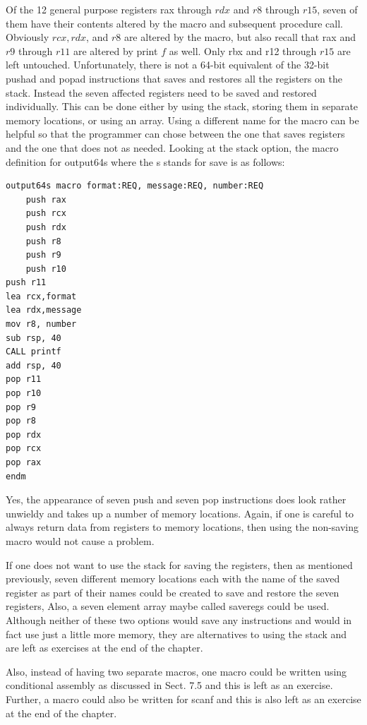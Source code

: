 \documentclass[10pt]{article}
\begin{document}
Of the 12 general purpose registers rax through $r d x$ and $r 8$ through $r 15$, seven of them have their contents altered by the macro and subsequent procedure call. Obviously $r c x, r d x$, and $r 8$ are altered by the macro, but also recall that rax and $r 9$ through $r 11$ are altered by print $f$ as well. Only rbx and r12 through $r 15$ are left untouched. Unfortunately, there is not a 64-bit equivalent of the 32-bit pushad and popad instructions that saves and restores all the registers on the stack. Instead the seven affected registers need to be saved and restored individually. This can be done either by using the stack, storing them in separate memory locations, or using an array. Using a different name for the macro can be helpful so that the programmer can chose between the one that saves registers and the one that does not as needed. Looking at the stack option, the macro definition for output64s where the s stands for save is as follows:

\begin{verbatim}
output64s macro format:REQ, message:REQ, number:REQ
    push rax
    push rcx
    push rdx
    push r8
    push r9
    push r10
push r11
lea rcx,format
lea rdx,message
mov r8, number
sub rsp, 40
CALL printf
add rsp, 40
pop r11
pop r10
pop r9
pop r8
pop rdx
pop rcx
pop rax
endm
\end{verbatim}

Yes, the appearance of seven push and seven pop instructions does look rather unwieldy and takes up a number of memory locations. Again, if one is careful to always return data from registers to memory locations, then using the non-saving macro would not cause a problem.

If one does not want to use the stack for saving the registers, then as mentioned previously, seven different memory locations each with the name of the saved register as part of their names could be created to save and restore the seven registers, Also, a seven element array maybe called saveregs could be used. Although neither of these two options would save any instructions and would in fact use just a little more memory, they are alternatives to using the stack and are left as exercises at the end of the chapter.

Also, instead of having two separate macros, one macro could be written using conditional assembly as discussed in Sect. 7.5 and this is left as an exercise. Further, a macro could also be written for scanf and this is also left as an exercise at the end of the chapter.
\end{document}
